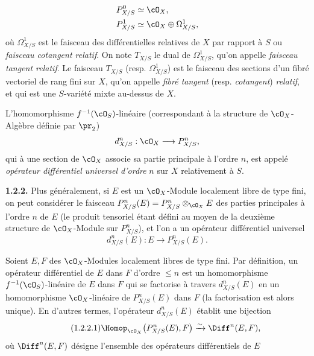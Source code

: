 \[
  \begin{aligned}
  P^0_{X/S}&\simeq\cO_X,\\
  P^1_{X/S}&\simeq\cO_X\oplus\Omega^1_{X/S},
  \end{aligned}
\]
où $\Omega^1_{X/S}$ est le faisceau des différentielles relatives de $X$ par rapport à $S$ ou \emph{faisceau cotangent relatif}. On note $T_{X/S}$ le dual de $\Omega^1_{X/S}$, qu'on appelle \emph{faisceau tangent relatif}. Le faisceau $T_{X/S}$ (resp. $\Omega^1_{X/S}$) est le faisceau des sections d'un fibré vectoriel de rang fini sur $X$, qu'on appelle \emph{fibré tangent} (resp. \emph{cotangent}) \emph{relatif}, et qui est une $S$-variété mixte au-dessus de $X$.

L'homomorphisme $f^{-1}(\cO_S)$-linéaire (correspondant à la structure de $\cO_X$-Algèbre définie par $\pr_2$)
\[
  d^n_{X/S}:\cO_X\longrightarrow P^n_{X/S},
\]
qui à une section de $\cO_X$ associe sa partie principale à l'ordre $n$, est appelé \emph{opérateur différentiel universel d'ordre} $n$ sur $X$ relativement à $S$.

\textbf{1.2.2.} Plus généralement, si $E$ est un $\cO_X$-Module localement libre de type fini, on peut considérer le faisceau $P^n_{X/S}(E)=P^n_{X/S}\otimes_{\cO_X}E$ des parties principales à l'ordre $n$ de $E$ (le produit tensoriel étant défini au moyen de la deuxième structure de $\cO_X$-Module sur $P^n_{X/S}$), et l'on a un opérateur différentiel universel
\[
  d^n_{X/S}(E):E\longrightarrow P^n_{X/S}(E).
\]

Soient $E,F$ des $\cO_X$-Modules localement libres de type fini. Par définition, un opérateur différentiel de $E$ dans $F$ d'ordre $\le n$ est un homomorphisme $f^{-1}(\cO_S)$-linéaire de $E$ dans $F$ qui se factorise à travers $d^n_{X/S}(E)$ en un homomorphisme $\cO_X$-linéaire de $P^n_{X/S}(E)$ dans $F$ (la factorisation est alors unique). En d'autres termes, l'opérateur $d^n_{X/S}(E)$ établit une bijection
\begin{equation}\tag{1.2.2.1}
  \Homop_{\cO_X}\bigl(P^n_{X/S}(E),F\bigr)
  \xrightarrow{\sim}
  \Diff^n(E,F),
\end{equation}
où $\Diff^n(E,F)$ désigne l'ensemble des opérateurs différentiels de $E$
